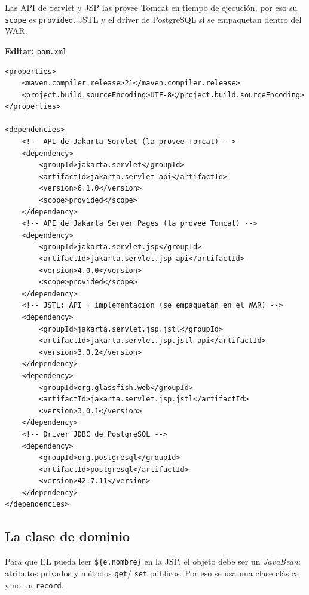 Las API de Servlet y JSP las provee Tomcat en tiempo de ejecución, por
eso su \texttt{scope} es \texttt{provided}. JSTL y el driver de
PostgreSQL sí se empaquetan dentro del WAR.

{\small\textbf{Editar:} \texttt{pom.xml}}
\begin{lstlisting}[style=xml,caption={Dependencias del proyecto JSP},label={lst:jsp-pom}]
<properties>
    <maven.compiler.release>21</maven.compiler.release>
    <project.build.sourceEncoding>UTF-8</project.build.sourceEncoding>
</properties>

<dependencies>
    <!-- API de Jakarta Servlet (la provee Tomcat) -->
    <dependency>
        <groupId>jakarta.servlet</groupId>
        <artifactId>jakarta.servlet-api</artifactId>
        <version>6.1.0</version>
        <scope>provided</scope>
    </dependency>
    <!-- API de Jakarta Server Pages (la provee Tomcat) -->
    <dependency>
        <groupId>jakarta.servlet.jsp</groupId>
        <artifactId>jakarta.servlet.jsp-api</artifactId>
        <version>4.0.0</version>
        <scope>provided</scope>
    </dependency>
    <!-- JSTL: API + implementacion (se empaquetan en el WAR) -->
    <dependency>
        <groupId>jakarta.servlet.jsp.jstl</groupId>
        <artifactId>jakarta.servlet.jsp.jstl-api</artifactId>
        <version>3.0.2</version>
    </dependency>
    <dependency>
        <groupId>org.glassfish.web</groupId>
        <artifactId>jakarta.servlet.jsp.jstl</artifactId>
        <version>3.0.1</version>
    </dependency>
    <!-- Driver JDBC de PostgreSQL -->
    <dependency>
        <groupId>org.postgresql</groupId>
        <artifactId>postgresql</artifactId>
        <version>42.7.11</version>
    </dependency>
</dependencies>
\end{lstlisting}

\subsection{La clase de dominio}
\label{ap:crud:jsp:dominio}

Para que EL pueda leer \texttt{\$\{e.nombre\}} en la JSP, el objeto debe
ser un \emph{JavaBean}: atributos privados y métodos \texttt{get}/%
\texttt{set} públicos. Por eso se usa una clase clásica y no un
\texttt{record}.


